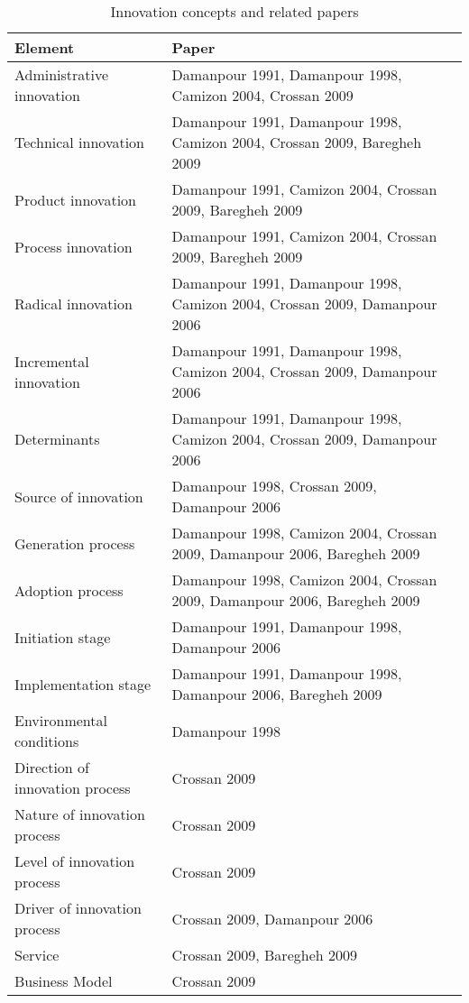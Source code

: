 \begin{table}[htbp]
  \centering
  \caption{Innovation concepts and related papers}
    \begin{tabular}{|p{5cm}|p{9cm}|}
    \toprule
    \textbf{Element} & \textbf{Paper} \\
    \midrule
    Administrative innovation & Damanpour 1991, Damanpour 1998, Camizon 2004, Crossan 2009  \\
    Technical innovation & Damanpour 1991, Damanpour 1998, Camizon 2004, Crossan 2009, Baregheh 2009  \\
    Product innovation & Damanpour 1991, Camizon 2004, Crossan 2009, Baregheh 2009  \\
    Process innovation & Damanpour 1991, Camizon 2004, Crossan 2009, Baregheh 2009  \\
    Radical innovation & Damanpour 1991, Damanpour 1998, Camizon 2004, Crossan 2009, Damanpour 2006  \\
    Incremental innovation & Damanpour 1991, Damanpour 1998, Camizon 2004, Crossan 2009, Damanpour 2006  \\
    Determinants & Damanpour 1991, Damanpour 1998, Camizon 2004, Crossan 2009, Damanpour 2006  \\
    Source of innovation & Damanpour 1998, Crossan 2009, Damanpour 2006  \\
    Generation process & Damanpour 1998, Camizon 2004, Crossan 2009, Damanpour 2006, Baregheh 2009  \\
    Adoption process & Damanpour 1998, Camizon 2004, Crossan 2009, Damanpour 2006, Baregheh 2009  \\
    Initiation stage & Damanpour 1991, Damanpour 1998, Damanpour 2006  \\
    Implementation stage & Damanpour 1991, Damanpour 1998, Damanpour 2006, Baregheh 2009  \\
    Environmental conditions & Damanpour 1998 \\
    Direction of innovation process  & Crossan 2009  \\
    Nature of innovation process & Crossan 2009  \\
    Level of innovation process & Crossan 2009  \\
    Driver of innovation process & Crossan 2009, Damanpour 2006  \\
    Service & Crossan 2009, Baregheh 2009  \\
    Business Model & Crossan 2009  \\

\end{tabular}
\end{table}

